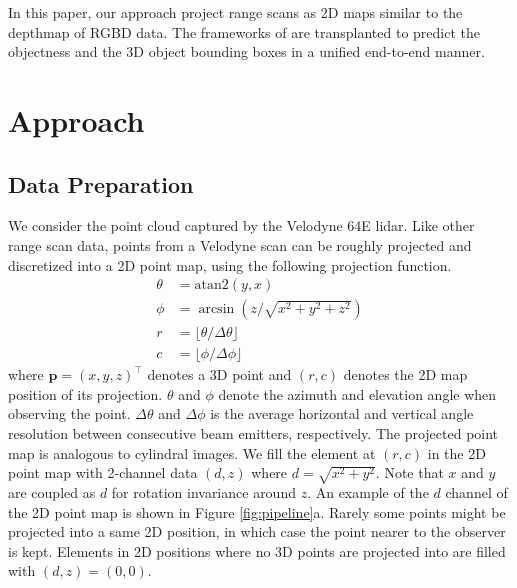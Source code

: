 \documentclass[conference]{IEEEtran}
\begin{document}
In this paper, our approach project range scans as 2D maps similar to the depthmap of RGBD data. The frameworks of \citet{Huang2015, Sermanet2013} are transplanted to predict the objectness and the 3D object bounding boxes in a unified end-to-end manner.

\section{Approach}


\subsection{Data Preparation}
We consider the point cloud captured by the Velodyne 64E lidar. Like other range scan data, points from a Velodyne scan can be roughly projected and discretized into a 2D point map, using the following projection function.
\begin{equation}
\begin{aligned}
    \theta &= \textrm{atan2} (y, x)\\
    \phi &= \arcsin (z / \sqrt{x^2 + y^2 + z^2})\\
    r &= \lfloor \theta / \Delta \theta \rfloor \\
    c &= \lfloor \phi / \Delta \phi \rfloor
\end{aligned}
\label{eq:projection}
\end{equation}
where $\mathbf{p} = (x, y, z)^\top$ denotes a 3D point and $(r, c)$ denotes the 2D map position of its projection. $\theta$ and $\phi$ denote the azimuth and elevation angle when observing the point. $\Delta \theta$ and $\Delta \phi$ is the average horizontal and vertical angle resolution between consecutive beam emitters, respectively. The projected point map is analogous to cylindral images. We fill the element at $(r, c)$ in the 2D point map with 2-channel data $(d, z)$ where $d = \sqrt{x^2 + y^2}$. Note that $x$ and $y$ are coupled as $d$ for rotation invariance around $z$. An example of the $d$ channel of the 2D point map is shown in Figure \ref{fig:pipeline}a. Rarely some points might be projected into a same 2D position, in which case the point nearer to the observer is kept. Elements in 2D positions where no 3D points are projected into are filled with $(d, z) = (0, 0)$. 
\end{document}
